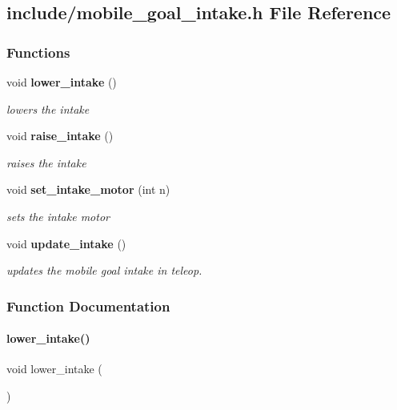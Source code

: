 \subsection{include/mobile\+\_\+goal\+\_\+intake.h File Reference}
\label{mobile__goal__intake_8h}
\subsubsection*{Functions}
\begin{DoxyCompactItemize}
\item 
void \textbf{ lower\+\_\+intake} ()
\begin{DoxyCompactList}\small\item\em lowers the intake \end{DoxyCompactList}\item 
void \textbf{ raise\+\_\+intake} ()
\begin{DoxyCompactList}\small\item\em raises the intake \end{DoxyCompactList}\item 
void \textbf{ set\+\_\+intake\+\_\+motor} (int n)
\begin{DoxyCompactList}\small\item\em sets the intake motor \end{DoxyCompactList}\item 
void \textbf{ update\+\_\+intake} ()
\begin{DoxyCompactList}\small\item\em updates the mobile goal intake in teleop. \end{DoxyCompactList}\end{DoxyCompactItemize}


\subsubsection{Function Documentation}
\mbox{\label{mobile__goal__intake_8h_aef03134014e51a6a90dd3824f09f4d6c}} 
\paragraph{lower\+\_\+intake()}
{\footnotesize\ttfamily void lower\+\_\+intake (\begin{DoxyParamCaption}{ }\end{DoxyParamCaption})}



